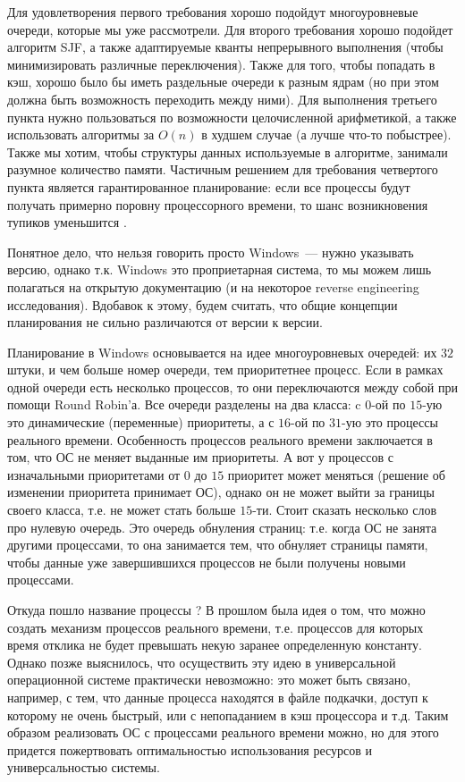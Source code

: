 Для удовлетворения первого требования хорошо подойдут многоуровневые очереди,
которые мы уже рассмотрели. Для второго требования хорошо подойдет алгоритм SJF,
а также адаптируемые кванты непрерывного выполнения (чтобы минимизировать
различные переключения). Также для того, чтобы попадать в кэш, хорошо было бы
иметь раздельные очереди к разным ядрам (но при этом должна быть возможность
переходить между ними). Для выполнения третьего пункта нужно пользоваться по
возможности целочисленной арифметикой, а также использовать алгоритмы за
\(O(n)\) в худшем случае (а лучше что-то побыстрее). Также мы хотим, чтобы
структуры данных используемые в алгоритме, занимали разумное количество памяти.
Частичным решением для требования четвертого пункта является гарантированное
планирование: если все процессы будут получать примерно поровну процессорного
времени, то шанс возникновения тупиков уменьшится .


Понятное дело, что нельзя говорить просто Windows~--- нужно указывать версию,
однако т.к. Windows это проприетарная система, то мы можем лишь полагаться на 
открытую документацию (и на некоторое reverse engineering исследования).
Вдобавок к этому, будем считать, что общие концепции планирования не сильно
различаются от версии к версии.

Планирование в Windows основывается на идее многоуровневых очередей: их \(32\)
штуки, и чем больше номер очереди, тем приоритетнее процесс. Если в рамках одной
очереди есть несколько процессов, то они переключаются между собой при помощи
Round Robin'а. Все очереди разделены на два класса: c \(0\)-ой по \(15\)-ую это
динамические (переменные) приоритеты, а с \(16\)-ой по \(31\)-ую это процессы
реального времени. Особенность процессов реального времени заключается в том,
что ОС не меняет выданные им приоритеты. А вот у процессов с изначальными
приоритетами от \(0\) до \(15\) приоритет может меняться (решение об изменении
приоритета принимает ОС), однако он не может выйти за границы своего класса,
т.е. не может стать больше \(15\)-ти. Стоит сказать несколько слов про нулевую
очередь. Это очередь обнуления страниц: т.е. когда ОС не занята другими
процессами, то она занимается тем, что обнуляет страницы памяти, чтобы данные
уже завершившихся процессов не были получены новыми процессами.

Откуда пошло название процессы ? В прошлом была идея о
том, что можно создать механизм процессов реального времени, т.е. процессов для
которых время отклика не будет превышать некую заранее определенную константу.
Однако позже выяснилось, что осуществить эту идею в универсальной операционной
системе практически невозможно: это может быть связано, например, с тем, что
данные процесса находятся в файле подкачки, доступ к которому не очень быстрый,
или с непопаданием в кэш процессора и т.д. Таким образом реализовать ОС с
процессами реального времени можно, но для этого придется пожертвовать
оптимальностью использования ресурсов и универсальностью системы.

